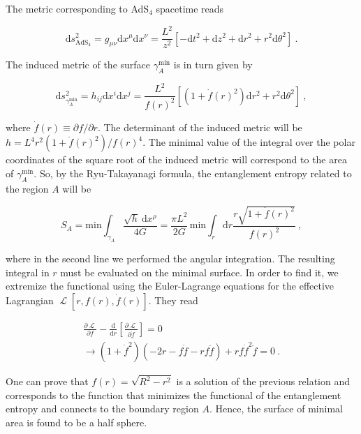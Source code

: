 \documentclass[twocolumn]{revtex4-2}
\providecommand{\eq}[2]{
    \begin{equation}
        #2
    \label{eq:#1}
    \end{equation}
}
\providecommand{\eqgat}[2]{
    \begin{gather}
        #2
    \label{eq:#1}
    \end{gather}
}
\DeclareMathOperator{\calL}{\mathcal{L}}
\begin{document}
The metric corresponding to AdS$_4$ spacetime reads
\eq{1Ametric}{
    \mathrm{d}s^2_{\text{AdS}_4} = g_{\mu \nu} \mathrm{d}x^\mu \mathrm{d}x^\nu = 
    \frac{L^2}{z^2} [ -\mathrm{d}t^2 + \mathrm{d}z^2 + \mathrm{d}r^2 + r^2 \mathrm{d}\theta^2 ] \ . \nonumber
}
The induced metric of the surface $\gamma_A^\text{min}$ is in turn given by
\eq{1gammaAmetric}{
    \mathrm{d}s^2_{\gamma_A^\text{min}} = h_{i j} \mathrm{d}x^i \mathrm{d}x^j = 
    \frac{L^2}{f(r)^2} \left[ \left( 1+ \dot{f}(r)^2 \right) \mathrm{d}r^2 + r^2 \mathrm{d}\theta^2 \right] \ , \nonumber
}
where $ \dot{f}(r) \equiv \partial f/\partial r$. The determinant of the induced metric will be
$
    h = L^4 r^2 ( 1 + \dot{f}(r)^2 )/f(r)^4 
$.  
The minimal value of the integral over the polar coordinates of the square root of the induced metric will correspond to the area of $\gamma_A^\text{min}$. So, by the Ryu-Takayanagi formula, the entanglement entropy related to the region $A$ will be
\eq{1EEA}{
    S_A = \text{min} \int_{\gamma_A}    \frac{\sqrt{h} \ \mathrm{d}x^\rho}{4G} = \frac{\pi L^2}{2G} \, \text{min} \int_r \mathrm{d}r \frac{r \sqrt{ 1 + \dot{f}(r)^2 }}{f(r)^2}  \ ,\nonumber
}
where in the second line we performed the angular integration. The resulting integral in $r$ must be evaluated on the minimal surface. In order to find it, we extremize the functional using the 
Euler-Lagrange equations for the effective Lagrangian $\calL [r,f(r),\dot{f}(r)]$. They read
\eqgat{1EL}{
    \frac{\partial \calL}{\partial f} - \frac{\mathrm{d}}{\mathrm{d}r} \left[ \frac{\partial \calL}{\partial \dot{f}} \right] = 0 \nonumber \\
    \longrightarrow \left( 1+\dot{f}^2 \right) \left( -2r-f\dot{f}-rf\ddot{f} \right) + rf\dot{f}^2\ddot{f} = 0 \ .\nonumber
}
One can prove that $f(r) = \sqrt{R^2 - r^2}$ is a solution of the previous relation and corresponds to the function that minimizes the functional of the entanglement entropy and connects to the boundary region $A$. Hence, the surface of minimal area is found to be a half sphere.
\end{document}
